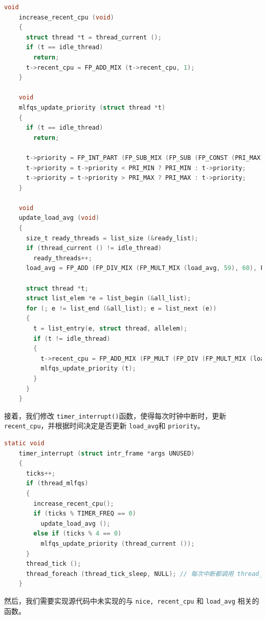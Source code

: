 \documentclass{article}
\begin{document}
\begin{lstlisting}[language=C, title=计算函数]
    void
    increase_recent_cpu (void)
    {
      struct thread *t = thread_current ();
      if (t == idle_thread)
        return;
      t->recent_cpu = FP_ADD_MIX (t->recent_cpu, 1);
    }
    
    void
    mlfqs_update_priority (struct thread *t)
    {
      if (t == idle_thread)
        return;
    
      t->priority = FP_INT_PART (FP_SUB_MIX (FP_SUB (FP_CONST (PRI_MAX), FP_DIV_MIX (t->recent_cpu, 4)), 2 * t->nice));
      t->priority = t->priority < PRI_MIN ? PRI_MIN : t->priority;
      t->priority = t->priority > PRI_MAX ? PRI_MAX : t->priority;
    }
    
    void
    update_load_avg (void)
    {
      size_t ready_threads = list_size (&ready_list);
      if (thread_current () != idle_thread)
        ready_threads++;
      load_avg = FP_ADD (FP_DIV_MIX (FP_MULT_MIX (load_avg, 59), 60), FP_DIV_MIX (FP_CONST (ready_threads), 60));
    
      struct thread *t;
      struct list_elem *e = list_begin (&all_list);
      for (; e != list_end (&all_list); e = list_next (e))
      {
        t = list_entry(e, struct thread, allelem);
        if (t != idle_thread)
        {
          t->recent_cpu = FP_ADD_MIX (FP_MULT (FP_DIV (FP_MULT_MIX (load_avg, 2), FP_ADD_MIX (FP_MULT_MIX (load_avg, 2), 1)), t->recent_cpu), t->nice);
          mlfqs_update_priority (t);
        }
      }
    }
\end{lstlisting}

接着，我们修改 \texttt{timer\_interrupt()}函数，使得每次时钟中断时，更新 \texttt{recent\_cpu}，并根据时间决定是否更新 \texttt{load\_avg}和 \texttt{priority}。

\begin{lstlisting}[language=C, title=修改后的\texttt{timer\_interrupt()}函数]
    static void
    timer_interrupt (struct intr_frame *args UNUSED)
    {
      ticks++;
      if (thread_mlfqs)
      {
        increase_recent_cpu();
        if (ticks % TIMER_FREQ == 0)
          update_load_avg ();
        else if (ticks % 4 == 0)
          mlfqs_update_priority (thread_current ());
      }
      thread_tick ();
      thread_foreach (thread_tick_sleep, NULL); // 每次中断都调用 thread_tick_sleep
    }

\end{lstlisting}

然后，我们需要实现源代码中未实现的与 \texttt{nice, recent\_cpu} 和 \texttt{load\_avg} 相关的函数。
\end{document}

